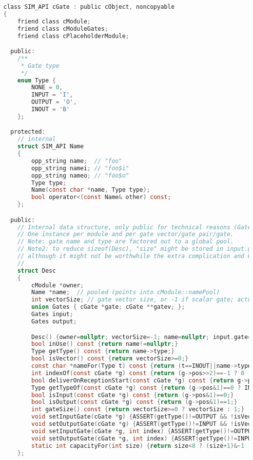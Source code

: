 \begin{lstlisting}[language=c]
class SIM_API cGate : public cObject, noncopyable
{
    friend class cModule;
    friend class cModuleGates;
    friend class cPlaceholderModule;

  public:
    /**
     * Gate type
     */
    enum Type {
        NONE = 0,
        INPUT = 'I',
        OUTPUT = 'O',
        INOUT = 'B'
    };

  protected:
    // internal
    struct SIM_API Name
    {
        opp_string name;  // "foo"
        opp_string namei; // "foo$i"
        opp_string nameo; // "foo$o"
        Type type;
        Name(const char *name, Type type);
        bool operator<(const Name& other) const;
    };

  public:
    // Internal data structure, only public for technical reasons (GateIterator).
    // One instance per module and per gate vector/gate pair/gate.
    // Note: gate name and type are factored out to a global pool.
    // Note2: to reduce sizeof(Desc), "size" might be stored in input.gatev[0],
    // although it might not be worthwhile the extra complication and CPU cycles.
    //
    struct Desc
    {
        cModule *owner;
        Name *name;  // pooled (points into cModule::namePool)
        int vectorSize; // gate vector size, or -1 if scalar gate; actually allocated size is capacityFor(size)
        union Gates { cGate *gate; cGate **gatev; };
        Gates input;
        Gates output;

        Desc() {owner=nullptr; vectorSize=-1; name=nullptr; input.gate=output.gate=nullptr;}
        bool inUse() const {return name!=nullptr;}
        Type getType() const {return name->type;}
        bool isVector() const {return vectorSize>=0;}
        const char *nameFor(Type t) const {return (t==INOUT||name->type!=INOUT) ? name->name.c_str() : t==INPUT ? name->namei.c_str() : name->nameo.c_str();}
        int indexOf(const cGate *g) const {return (g->pos>>2)==-1 ? 0 : g->pos>>2;}
        bool deliverOnReceptionStart(const cGate *g) const {return g->pos&2;}
        Type getTypeOf(const cGate *g) const {return (g->pos&1)==0 ? INPUT : OUTPUT;}
        bool isInput(const cGate *g) const {return (g->pos&1)==0;}
        bool isOutput(const cGate *g) const {return (g->pos&1)==1;}
        int gateSize() const {return vectorSize>=0 ? vectorSize : 1;}
        void setInputGate(cGate *g) {ASSERT(getType()!=OUTPUT && !isVector()); input.gate=g; g->desc=this; g->pos=(-(1<<2));}
        void setOutputGate(cGate *g) {ASSERT(getType()!=INPUT && !isVector()); output.gate=g; g->desc=this; g->pos=(-(1<<2))|1;}
        void setInputGate(cGate *g, int index) {ASSERT(getType()!=OUTPUT && isVector()); input.gatev[index]=g; g->desc=this; g->pos=(index<<2);}
        void setOutputGate(cGate *g, int index) {ASSERT(getType()!=INPUT && isVector()); output.gatev[index]=g; g->desc=this; g->pos=(index<<2)|1;}
        static int capacityFor(int size) {return size<8 ? (size+1)&~1 : size<32 ? (size+3)&~3 : size<256 ? (size+15)&~15 : (size+63)&~63;}
    };


\end{lstlisting}
